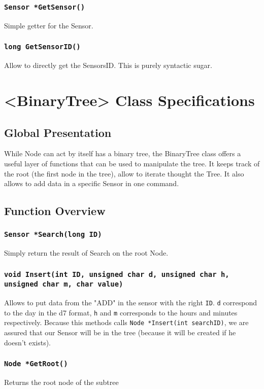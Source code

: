 \documentclass[10pt]{article}
\begin{document}
\subsubsection*{\tt Sensor *GetSensor()}
Simple getter for the Sensor.

\subsubsection*{\tt long GetSensorID()}
Allow to directly get the SensorsID. This is purely syntactic sugar.

\section{<BinaryTree> Class Specifications}
\subsection{Global Presentation}
While Node can act by itself has a binary tree, the BinaryTree class offers a useful layer of functions that can be used to manipulate the tree. It keeps track of the root (the first node in the tree), allow to iterate thought the Tree. It also allows to add data in a specific Sensor in one command.

\subsection{Function Overview}
\subsubsection*{\tt Sensor *Search(long ID)}
Simply return the result of Search on the root Node.

\subsubsection*{\tt void Insert(int ID, 
				unsigned char d,
				unsigned char h,
				unsigned char m,
				char value)}
Allows to put data from the "ADD" in the sensor with the right \texttt{ID}. \texttt d correspond to the day in the d7 format, \texttt h and \texttt m corresponds to the hours and minutes respectively. Because this methods calls {\tt Node *Insert(int searchID)}, we are assured that our Sensor will be in the tree (because it will be created if he doesn't exists).

\subsubsection*{\tt Node *GetRoot()}
Returns the root node of the subtree
\end{document}
